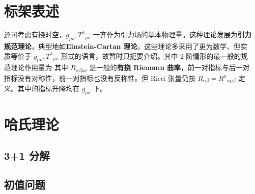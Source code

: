 
\section{标架表述}

还可考虑有挠时空，$g_{\mu\nu},T^\lambda{}_{\mu\nu}$ 一齐作为引力场的基本物理量。这种理论发展为\textbf{引力规范理论}，典型地如\textbf{Einstein-Cartan 理论}。这些理论多采用了更为数学、但实质等价于 $g_{\mu\nu},T^\lambda{}_{\mu\nu}$ 形式的语言，故暂时只扼要介绍。其中 2 阶情形的最一般的规范理论作用量为
其中 $R_{\alpha \beta \mu \nu}$ 是一般的\textbf{有挠 Riemann 曲率}，前一对指标与后一对指标没有对称性，前一对指标也没有反称性。但 Ricci 张量仍按 $R_{\alpha \beta}=R^\mu{ }_{\alpha \mu \beta}$ 定义。其中的指标升降均在 $g_{\mu\nu}$ 下。


\section{哈氏理论}


\subsection{3+1 分解}

\subsection{初值问题}

